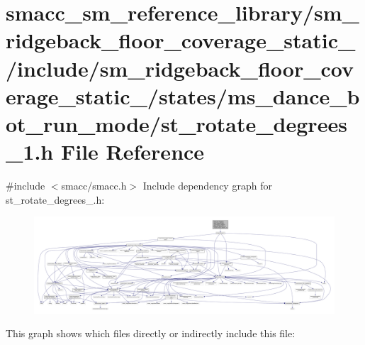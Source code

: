\hypertarget{sm__ridgeback__floor__coverage__static__1_2include_2sm__ridgeback__floor__coverage__static__1_2s4b58e67616221f99ac2a3c79ac638e3f}{}\section{smacc\+\_\+sm\+\_\+reference\+\_\+library/sm\+\_\+ridgeback\+\_\+floor\+\_\+coverage\+\_\+static\+\_/include/sm\+\_\+ridgeback\+\_\+floor\+\_\+coverage\+\_\+static\+\_/states/ms\+\_\+dance\+\_\+bot\+\_\+run\+\_\+mode/st\+\_\+rotate\+\_\+degrees\+\_\+1.h File Reference}
\label{sm__ridgeback__floor__coverage__static__1_2include_2sm__ridgeback__floor__coverage__static__1_2s4b58e67616221f99ac2a3c79ac638e3f}
{\ttfamily \#include $<$smacc/smacc.\+h$>$}\newline
Include dependency graph for st\+\_\+rotate\+\_\+degrees\+\_.\+h\+:
\nopagebreak
\begin{figure}[H]
\begin{center}
\leavevmode
\includegraphics[width=350pt]{sm__ridgeback__floor__coverage__static__1_2include_2sm__ridgeback__floor__coverage__static__1_2s4145b4dee8be88e60524964a85b4616a}
\end{center}
\end{figure}
This graph shows which files directly or indirectly include this file\+:
\nopagebreak
